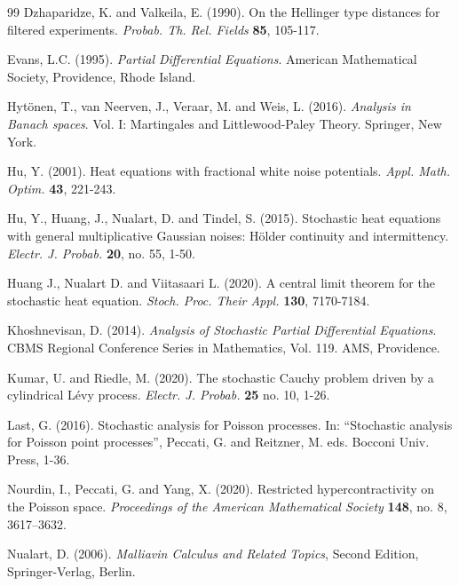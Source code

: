 \documentclass[12pt]{article}
\begin{document}
\begin{thebibliography}{99}
 Dzhaparidze, K. and Valkeila, E. (1990). On the Hellinger type distances for filtered experiments. {\em Probab. Th. Rel. Fields} {\bf 85}, 105-117.

 Evans, L.C. (1995). {\em Partial Differential Equations}. American Mathematical Society, Providence, Rhode Island.
 

 Hyt\"onen, T., van Neerven, J., Veraar, M. and  Weis, L. (2016). {\em Analysis in
Banach spaces}. Vol. I: Martingales and Littlewood-Paley Theory. Springer, New York.


 Hu, Y. (2001). Heat equations with fractional white
noise potentials. {\em Appl. Math. Optim.} {\bf 43}, 221-243.

 Hu, Y., Huang, J., Nualart, D. and Tindel, S. (2015).
Stochastic heat equations with general multiplicative Gaussian noises: H\"older continuity and intermittency.
{\em Electr. J. Probab.} {\bf 20}, no. 55, 1-50.

 Huang J., Nualart D. and Viitasaari L. (2020).  A central
    limit theorem for the stochastic heat equation. {\em Stoch. Proc. Their
    Appl.} {\bf 130}, 7170-7184.

 Khoshnevisan, D. (2014). {\em Analysis of Stochastic Partial Differential Equations}. CBMS Regional Conference Series in Mathematics, Vol. 119. AMS, Providence.
    
 Kumar, U. and Riedle, M. (2020). The stochastic Cauchy problem driven by a cylindrical
L\'evy process. {\em Electr. J. Probab.} {\bf 25} no. 10, 1-26.

 Last, G. (2016). Stochastic analysis for Poisson processes.
In: ``Stochastic analysis for Poisson point processes'', Peccati, G. and Reitzner, M. eds.
Bocconi Univ. Press, 1-36.

    
Nourdin, I., Peccati, G. and Yang, X. (2020).
Restricted hypercontractivity on the Poisson space.
{\em Proceedings of the American Mathematical Society} {\bf 148}, no. 8,
3617--3632.
 
 Nualart, D. (2006). {\em Malliavin Calculus and
Related Topics}, Second Edition, Springer-Verlag, Berlin.
 


\end{thebibliography}
\end{document}
